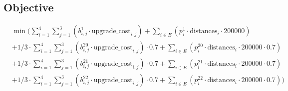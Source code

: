 \documentclass{article}
\begin{document}
	
	\subsection*{Objective}
		\begin{align*}
		&\min(  \sum_{i = 1}^{4} \sum_{j = 1}^{3} (b^{1}_{i,j}  \cdot \text{upgrade\_cost}_{i,j}) + \sum_{i \in E} (p^{1}_i \cdot \text{distances}_{i} \cdot 200000)\\
		&+ 1/3 \cdot \sum_{i = 1}^{4} \sum_{j = 1}^{3} (b^{20}_{i,j}  \cdot \text{upgrade\_cost}_{i,j}) \cdot 0.7 +  \sum_{i \in E} (p^{20}_i \cdot \text{distances}_{i} \cdot 200000 \cdot 0.7) \\
		&+ 1/3 \cdot \sum_{i = 1}^{4} \sum_{j = 1}^{3} (b^{21}_{i,j}  \cdot \text{upgrade\_cost}_{i,j}) \cdot 0.7 +  \sum_{i \in E} (p^{21}_i \cdot \text{distances}_{i} \cdot 200000 \cdot 0.7) \\
		&+ 1/3 \cdot \sum_{i = 1}^{4} \sum_{j = 1}^{3} (b^{22}_{i,j}  \cdot \text{upgrade\_cost}_{i,j}) \cdot 0.7 +  \sum_{i \in E} (p^{22}_i \cdot \text{distances}_{i} \cdot 200000 \cdot 0.7)) \\
		\end{align*}
	  
\end{document}
